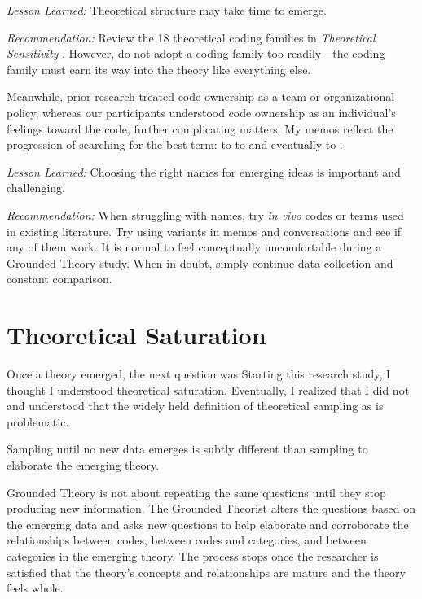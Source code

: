 \textit{Lesson Learned:} Theoretical structure may take time to emerge.

\textit{Recommendation:} Review the 18 theoretical coding families in \textit{Theoretical Sensitivity} \cite{GlaserTheoreticalSensitivity}. However, do not adopt a coding family too readily---the coding family must earn its way into the theory like everything else.

Meanwhile, prior research treated code ownership as a team or organizational policy, whereas  our participants understood code ownership as an individual's feelings toward the code, further complicating matters. My memos reflect the progression of searching for the best term:  to  to  and eventually to .

\textit{Lesson Learned:} Choosing the right names for emerging ideas is important and challenging.  

\textit{Recommendation:} When struggling with names, try \textit{in vivo} codes or terms used in existing literature. Try using variants in memos and conversations and see if any of them work. It is normal to feel conceptually uncomfortable during a Grounded Theory study. When in doubt, simply continue data collection and constant comparison.
\section{Theoretical Saturation}
\label{TheoreticalSaturation}
Once a theory emerged, the next question was  Starting this research study, I thought I understood theoretical saturation. Eventually, I realized that I did not and understood that the widely held definition of theoretical sampling as  \cite{MorseTheoreticalSaturation} is problematic. 

Sampling until no new data emerges is subtly different than sampling to elaborate the emerging theory. 

Grounded Theory is not about repeating the same questions until they stop producing new information. The Grounded Theorist alters the questions based on the emerging data and asks new questions to help elaborate and corroborate the relationships between codes, between codes and categories, and between categories in the emerging theory. The process stops once the researcher is satisfied that the theory's concepts and relationships are mature and the theory feels whole. 

